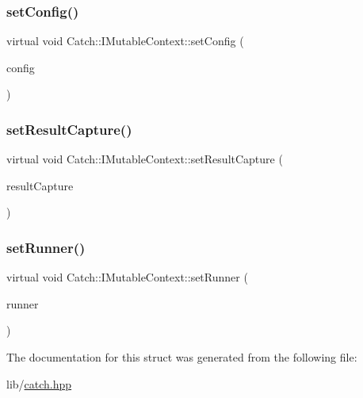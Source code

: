 \subsubsection{\texorpdfstring{set\+Config()}{setConfig()}}
{\footnotesize\ttfamily virtual void Catch\+::\+I\+Mutable\+Context\+::set\+Config (\begin{DoxyParamCaption}\item[{\hyperlink{class_catch_1_1_ptr}{Ptr}$<$ I\+Config const $>$ const \&}]{config }\end{DoxyParamCaption})\hspace{0.3cm}{\ttfamily [pure virtual]}}

\hypertarget{struct_catch_1_1_i_mutable_context_a4a80afd0525b7def21bee8d9b48f2d39}{}\label{struct_catch_1_1_i_mutable_context_a4a80afd0525b7def21bee8d9b48f2d39} 
\subsubsection{\texorpdfstring{set\+Result\+Capture()}{setResultCapture()}}
{\footnotesize\ttfamily virtual void Catch\+::\+I\+Mutable\+Context\+::set\+Result\+Capture (\begin{DoxyParamCaption}\item[{\hyperlink{struct_catch_1_1_i_result_capture}{I\+Result\+Capture} $\ast$}]{result\+Capture }\end{DoxyParamCaption})\hspace{0.3cm}{\ttfamily [pure virtual]}}

\hypertarget{struct_catch_1_1_i_mutable_context_af2e53b1dea4527a2587cff266a730f6e}{}\label{struct_catch_1_1_i_mutable_context_af2e53b1dea4527a2587cff266a730f6e} 
\subsubsection{\texorpdfstring{set\+Runner()}{setRunner()}}
{\footnotesize\ttfamily virtual void Catch\+::\+I\+Mutable\+Context\+::set\+Runner (\begin{DoxyParamCaption}\item[{\hyperlink{struct_catch_1_1_i_runner}{I\+Runner} $\ast$}]{runner }\end{DoxyParamCaption})\hspace{0.3cm}{\ttfamily [pure virtual]}}



The documentation for this struct was generated from the following file\+:\begin{DoxyCompactItemize}
\item 
lib/\hyperlink{catch_8hpp}{catch.\+hpp}\end{DoxyCompactItemize}
